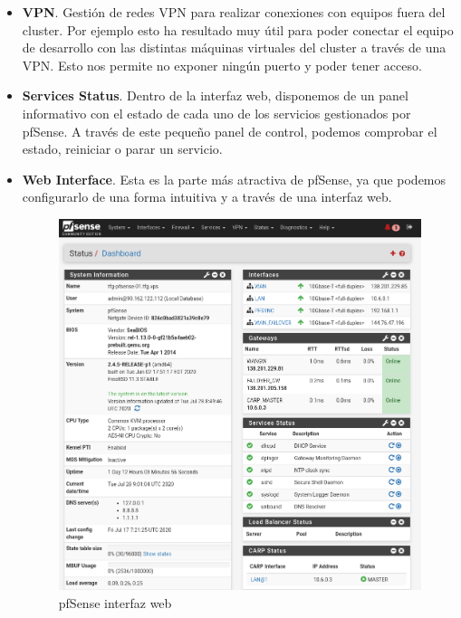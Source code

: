 \begin{text}
\begin{itemize}
                                        \item \textbf{VPN}. Gestión de redes VPN para realizar conexiones con equipos fuera del cluster. Por ejemplo esto ha resultado muy útil para poder conectar el equipo de desarrollo con las distintas máquinas virtuales del cluster a través de una VPN. Esto nos permite no exponer ningún puerto y poder tener acceso.
                                        \item \textbf{Services Status}. Dentro de la interfaz web, disponemos de un panel informativo con el estado de cada uno de los servicios gestionados por pfSense. A través de este pequeño panel de control, podemos comprobar el estado, reiniciar o parar un servicio.
                                        \item \textbf{Web Interface}. Esta es la parte más atractiva de pfSense, ya que podemos configurarlo de una forma intuitiva y a través de una interfaz web.
                                        \begin{figure}[!hbt]
                                                \centering
                                                \includegraphics[scale=0.3]{imagenes/Diseno/pfsense_wui.png}
                                                \caption[pfSense interfaz web]{pfSense interfaz web} 
                                                \label{pfsense_wui}
                                        \end{figure}
                                \end{itemize}
                        \end{text}
                \clearpage
